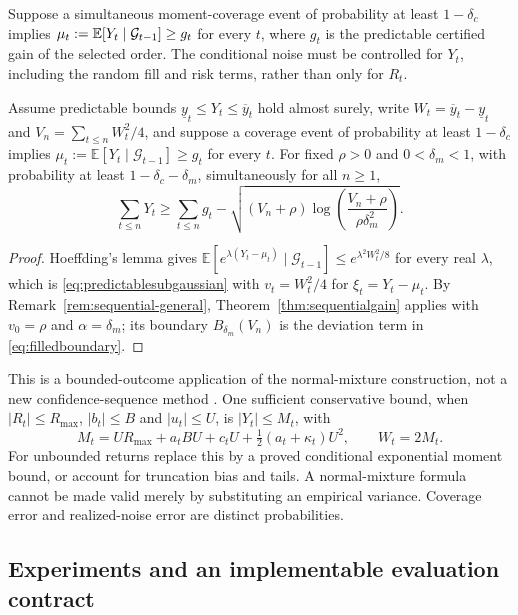 Suppose a simultaneous moment-coverage event of probability at least
$1-\delta_c$ implies $\mu_t:=\mathbb E[Y_t\mid\mathcal G_{t-1}]\ge g_t$
for every $t$, where $g_t$ is the predictable certified gain of the selected
order. The conditional noise must be controlled for $Y_t$, including the
random fill and risk terms, rather than only for $R_t$.

\begin{corollary}\label{thm:filledsequential}
Assume predictable bounds $\underline y_t\le Y_t\le\overline y_t$ hold almost surely, write
$W_t=\overline y_t-\underline y_t$ and $V_n=\sum_{t\le n}W_t^2/4$, and suppose a coverage event of
probability at least $1-\delta_c$ implies
$\mu_t:=\mathbb E[Y_t\mid\mathcal G_{t-1}]\ge g_t$ for every $t$. For fixed
$\rho>0$ and $0<\delta_m<1$, with probability at least $1-\delta_c-\delta_m$,
simultaneously for all $n\ge1$, \begin{equation}\label{eq:filledboundary}
 \sum_{t\le n}Y_t\ge\sum_{t\le n}g_t-
 \sqrt{(V_n+\rho)\log\!\left(\frac{V_n+\rho}{\rho\delta_m^2}\right)}.
\end{equation}
\end{corollary}

\begin{proof}
Hoeffding's lemma gives
$\mathbb E[e^{\lambda(Y_t-\mu_t)}\mid\mathcal G_{t-1}]\le e^{\lambda^2W_t^2/8}$
for every real $\lambda$, which is \eqref{eq:predictablesubgaussian} with $v_t=W_t^2/4$ for
$\xi_t=Y_t-\mu_t$. By Remark~\ref{rem:sequential-general},
Theorem~\ref{thm:sequentialgain} applies with $v_0=\rho$ and $\alpha=\delta_m$; its
boundary $B_{\delta_m}(V_n)$ is the deviation term in \eqref{eq:filledboundary}.
\end{proof}


This is a bounded-outcome application of the normal-mixture construction,
not a new confidence-sequence method \citep{HowardEtAl2021}. One sufficient
conservative bound, when $|R_t|\le R_{\max}$, $|b_t|\le B$ and
$|u_t|\le U$, is $|Y_t|\le M_t$, with
\[
 M_t=UR_{\max}+a_tBU+c_tU+\tfrac12(a_t+\kappa_t)U^2,
 \qquad W_t=2M_t.
\]
For unbounded returns replace this by a proved conditional exponential
moment bound, or account for truncation bias and tails. A normal-mixture
formula cannot be made valid merely by substituting an empirical variance.
Coverage error and realized-noise error are distinct probabilities.

\subsection{Experiments and an implementable evaluation contract}

